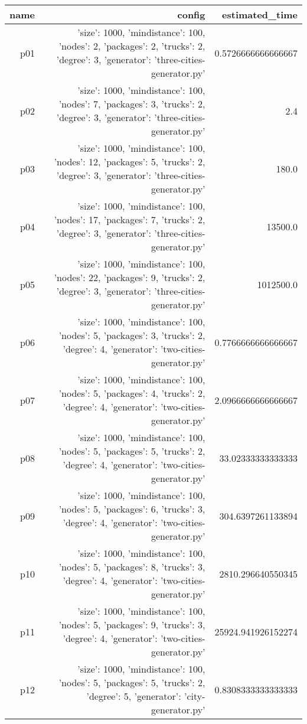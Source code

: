 \documentclass{article}
\begin{document}
                            \begin{center}
                            \scriptsize
                            \begin{tabular}{r|r|r}
                            name & config & estimated\_time\\\midrule
                              p01&{'size': 1000, 'mindistance': 100, 'nodes': 2, 'packages': 2, 'trucks': 2, 'degree': 3, 'generator': 'three-cities-generator.py'}&0.5726666666666667\\
  p02&{'size': 1000, 'mindistance': 100, 'nodes': 7, 'packages': 3, 'trucks': 2, 'degree': 3, 'generator': 'three-cities-generator.py'}&2.4\\
  p03&{'size': 1000, 'mindistance': 100, 'nodes': 12, 'packages': 5, 'trucks': 2, 'degree': 3, 'generator': 'three-cities-generator.py'}&180.0\\
  p04&{'size': 1000, 'mindistance': 100, 'nodes': 17, 'packages': 7, 'trucks': 2, 'degree': 3, 'generator': 'three-cities-generator.py'}&13500.0\\
  p05&{'size': 1000, 'mindistance': 100, 'nodes': 22, 'packages': 9, 'trucks': 2, 'degree': 3, 'generator': 'three-cities-generator.py'}&1012500.0\\
  p06&{'size': 1000, 'mindistance': 100, 'nodes': 5, 'packages': 3, 'trucks': 2, 'degree': 4, 'generator': 'two-cities-generator.py'}&0.7766666666666667\\
  p07&{'size': 1000, 'mindistance': 100, 'nodes': 5, 'packages': 4, 'trucks': 2, 'degree': 4, 'generator': 'two-cities-generator.py'}&2.0966666666666667\\
  p08&{'size': 1000, 'mindistance': 100, 'nodes': 5, 'packages': 5, 'trucks': 2, 'degree': 4, 'generator': 'two-cities-generator.py'}&33.02333333333333\\
  p09&{'size': 1000, 'mindistance': 100, 'nodes': 5, 'packages': 6, 'trucks': 3, 'degree': 4, 'generator': 'two-cities-generator.py'}&304.6397261133894\\
  p10&{'size': 1000, 'mindistance': 100, 'nodes': 5, 'packages': 8, 'trucks': 3, 'degree': 4, 'generator': 'two-cities-generator.py'}&2810.296640550345\\
  p11&{'size': 1000, 'mindistance': 100, 'nodes': 5, 'packages': 9, 'trucks': 3, 'degree': 4, 'generator': 'two-cities-generator.py'}&25924.941926152274\\
  p12&{'size': 1000, 'mindistance': 100, 'nodes': 5, 'packages': 5, 'trucks': 2, 'degree': 5, 'generator': 'city-generator.py'}&0.8308333333333333\\

\end{tabular}
\end{center}
\end{document}
